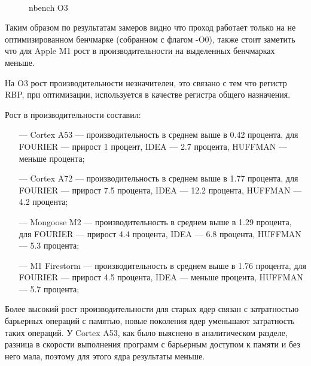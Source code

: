 \begin{figure}[hbtp]
	\centering
	\\
	\caption{nbench O3}
	\label{fig:o3}
\end{figure}

\newpage

Таким образом по результатам замеров видно что проход работает только на не оптимизированном бенчмарке (собранном с флагом -O0), также стоит заметить что для Apple M1 рост в производительности на выделенных бенчмарках меньше.

На O3 рост производительности незначителен, это связано с тем что регистр RBP, при оптимизации, используется в качестве регистра общего назначения.

Рост в производительности составил:
\begin{itemize}[leftmargin=1.6\parindent]
	\item[---] Cortex A53 --- производительность в среднем выше в 0.42 процента, для FOURIER --- прирост 1 процент, IDEA --- 2.7 процента, HUFFMAN --- меньше процента;
	\item[---] Cortex A72 --- производительность в среднем выше в 1.77 процента, для FOURIER --- прирост 7.5 процента, IDEA --- 12.2 процента, HUFFMAN --- 4.2 процента;
	\item[---] Mongoose M2 --- производительность в среднем выше в 1.29 процента, для FOURIER --- прирост 4.4 процента, IDEA --- 6.8 процента, HUFFMAN --- 5.3 процента;
	\item[---] M1 Firestorm --- производительность в среднем выше в 1.76 процента, для FOURIER --- прирост 4.5 процента, IDEA --- меньше процента, HUFFMAN --- 5.7 процента;
\end{itemize}

Более высокий рост производительности для старых ядер связан с затратностью барьерных операций с памятью, новые поколения ядер уменьшают затратность таких операций. У Cortex A53, как было выяснено в аналитическом разделе, разница в скорости выполнения программ с барьерным доступом к памяти и без него мала, поэтому для этого ядра результаты меньше.

